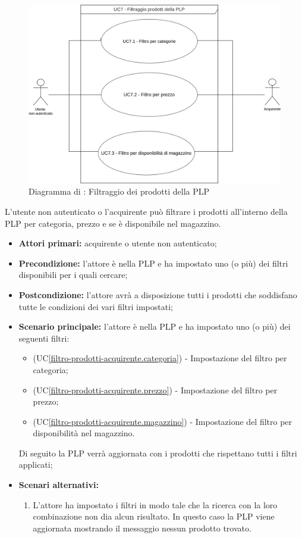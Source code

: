 \begin{figure}[H]
    \centering
    \includegraphics[scale=0.8]{Immagini/DiagrammiUC/Acquirente/FiltraggioProdotti.png}
    \caption{Diagramma di \actualUC: Filtraggio dei prodotti della PLP}
    \label{fig:filtro-prodotti-acquirente}
\end{figure}

L'utente non autenticato o l'acquirente può filtrare i prodotti all'interno della PLP per categoria, prezzo e se è disponibile nel magazzino.
\begin{itemize}
    \item \textbf{Attori primari:} acquirente o utente non autenticato;
    \item \textbf{Precondizione:} l'attore è nella PLP e ha impostato uno (o più) dei filtri disponibili per i quali cercare;
    \item \textbf{Postcondizione:} l'attore avrà a disposizione tutti i prodotti che soddisfano tutte le condizioni dei vari filtri impostati;
    \item \textbf{Scenario principale:} l'attore è nella PLP e ha impostato uno (o più) dei seguenti filtri:
    \begin{itemize}
        \item (UC\ref{filtro-prodotti-acquirente.categoria}) - Impostazione del filtro per categoria;
        \item (UC\ref{filtro-prodotti-acquirente.prezzo}) - Impostazione del filtro per prezzo;
        \item (UC\ref{filtro-prodotti-acquirente.magazzino}) - Impostazione del filtro per disponibilità nel magazzino.
    \end{itemize}
    Di seguito la PLP verrà aggiornata con i prodotti che rispettano tutti i filtri applicati;
    \item \textbf{Scenari alternativi:}
    \begin{enumerate}[label=\lett]
        \item L'attore ha impostato i filtri in modo tale che la ricerca con la loro combinazione non dia alcun risultato. In questo caso la PLP viene aggiornata mostrando il messaggio nessun prodotto trovato.
    \end{enumerate}
\end{itemize}

